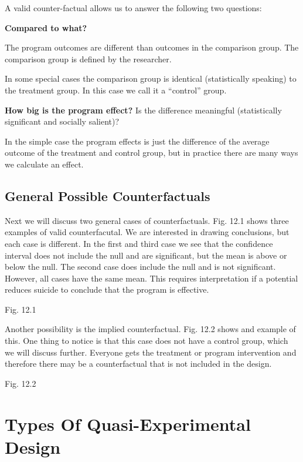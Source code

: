 \documentclass[]{book}
\theoremstyle{definition}
\theoremstyle{definition}
\theoremstyle{definition}
\theoremstyle{remark}
\begin{document}
A valid counter-factual allows us to answer the following two questions:

\textbf{Compared to what?}

The program outcomes are different than outcomes in the comparison
group. The comparison group is defined by the researcher.

In some special cases the comparison group is identical (statistically
speaking) to the treatment group. In this case we call it a ``control''
group.

\textbf{How big is the program effect?} Is the difference meaningful
(statistically significant and socially salient)?

In the simple case the program effects is just the difference of the
average outcome of the treatment and control group, but in practice
there are many ways we calculate an effect.

\hypertarget{general-possible-counterfactuals}{%
\subsection{General Possible
Counterfactuals}\label{general-possible-counterfactuals}}

Next we will discuss two general cases of counterfactuals. Fig. 12.1
shows three examples of valid counterfacutal. We are interested in
drawing conclusions, but each case is different. In the first and third
case we see that the confidence interval does not include the null and
are significant, but the mean is above or below the null. The second
case does include the null and is not significant. However, all cases
have the same mean. This requires interpretation if a potential reduces
suicide to conclude that the program is effective.

Fig. 12.1

Another possibility is the implied counterfactual. Fig. 12.2 shows and
example of this. One thing to notice is that this case does not have a
control group, which we will discuss further. Everyone gets the
treatment or program intervention and therefore there may be a
counterfactual that is not included in the design.

Fig. 12.2

\hypertarget{types-of-quasi-experimental-design}{%
\section{Types Of Quasi-Experimental
Design}\label{types-of-quasi-experimental-design}}
\end{document}
